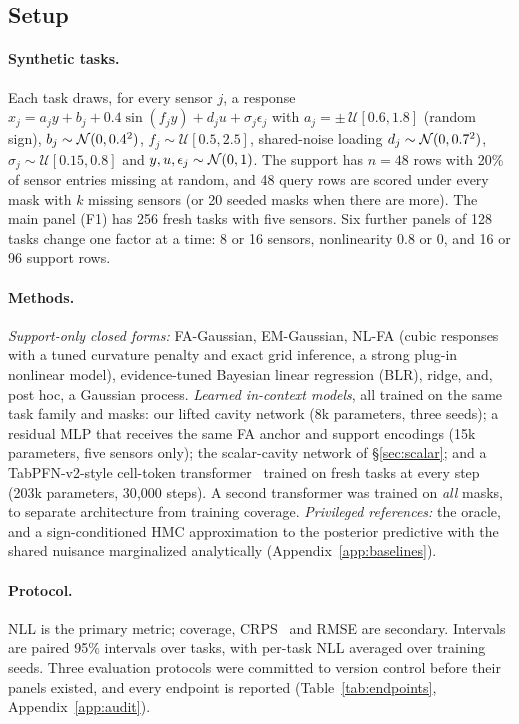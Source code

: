 \subsection{Setup}
\label{sec:exp-setup}

\paragraph{Synthetic tasks.}
Each task draws, for every sensor $j$, a response $x_j=a_jy+b_j+0.4\sin(f_jy)+d_ju+\sigma_j\epsilon_j$ with
$a_j=\pm\,\mathcal{U}[0.6,1.8]$ (random sign), $b_j\sim\mathcal{N}(0,0.4^2)$, $f_j\sim\mathcal{U}[0.5,2.5]$, shared-noise
loading $d_j\sim\mathcal{N}(0,0.7^2)$, $\sigma_j\sim\mathcal{U}[0.15,0.8]$ and $y,u,\epsilon_j\sim\mathcal{N}(0,1)$. The support has
$n=48$ rows with 20\% of sensor entries missing at random, and 48 query rows are scored under every mask with $k$
missing sensors (or 20 seeded masks when there are more). The main panel (F1) has 256 fresh tasks with five sensors.
Six further panels of 128 tasks change one factor at a time: 8 or 16 sensors, nonlinearity 0.8 or 0, and 16 or 96
support rows.

\paragraph{Methods.}
\emph{Support-only closed forms:} FA-Gaussian, EM-Gaussian, NL-FA (cubic responses with a tuned curvature penalty and
exact grid inference, a strong plug-in nonlinear model), evidence-tuned Bayesian linear regression (BLR), ridge, and,
post hoc, a Gaussian process. \emph{Learned in-context models}, all trained on the same task family and masks: our
lifted cavity network (8k parameters, three seeds); a residual MLP that receives the same FA anchor and support
encodings (15k parameters, five sensors only); the scalar-cavity network of \S\ref{sec:scalar}; and a TabPFN-v2-style
cell-token transformer~\citep{hollmann2025tabpfnv2} trained on fresh tasks at every step (203k parameters, 30{,}000
steps). A second transformer was trained on \emph{all} masks, to separate architecture from training coverage.
\emph{Privileged references:} the oracle, and a sign-conditioned HMC approximation to the posterior predictive with the shared nuisance
marginalized analytically (Appendix~\ref{app:baselines}).

\paragraph{Protocol.}
NLL is the primary metric; coverage, CRPS~\citep{gneiting2007scoring} and RMSE are secondary. Intervals are paired
95\% intervals over tasks, with per-task NLL averaged over training seeds. Three evaluation protocols were committed
to version control before their panels existed, and every endpoint is reported (Table~\ref{tab:endpoints},
Appendix~\ref{app:audit}).
